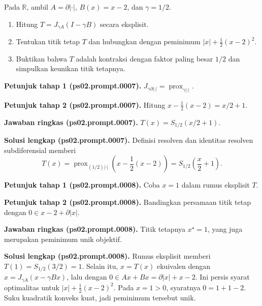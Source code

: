 \begin{exercise}
\label{orig03:ps02:problem:0004}
Pada $\mathbb{R}$, ambil $A=\partial|\cdot|$, $B(x)=x-2$, dan $\gamma=1/2$.
\begin{enumerate}
\item\label{orig03:ps02:prompt:0007}
Hitung $T=J_{\gamma A}(I-\gamma B)$ secara eksplisit.
\item\label{orig03:ps02:prompt:0008}
Tentukan titik tetap $T$ dan hubungkan dengan peminimum
$|x|+\tfrac12(x-2)^2$.
\item\label{orig03:ps02:prompt:0009}
Buktikan bahwa $T$ adalah kontraksi dengan faktor paling besar $1/2$ dan
simpulkan keunikan titik tetapnya.
\end{enumerate}
\end{exercise}

\par\noindent\textbf{Petunjuk tahap 1 (ps02.prompt.0007).}
$J_{\gamma\partial|\cdot|}=\operatorname{prox}_{\gamma|\cdot|}$.
\label{orig03:ps02:hint1:0007}
\par\noindent\textbf{Petunjuk tahap 2 (ps02.prompt.0007).}
Hitung $x-\tfrac12(x-2)=x/2+1$.
\label{orig03:ps02:hint2:0007}
\par\noindent\textbf{Jawaban ringkas (ps02.prompt.0007).}
$T(x)=S_{1/2}(x/2+1)$.
\label{orig03:ps02:answer:0007}
\par\noindent\textbf{Solusi lengkap (ps02.prompt.0007).}
Definisi resolven dan identitas resolven subdiferensial memberi
\[
 T(x)=\operatorname{prox}_{(1/2)|\cdot|}
 \left(x-\frac12(x-2)\right)
 =S_{1/2}\left(\frac x2+1\right).
\]
\label{orig03:ps02:solution:0007}

\par\noindent\textbf{Petunjuk tahap 1 (ps02.prompt.0008).}
Coba $x=1$ dalam rumus eksplisit $T$.
\label{orig03:ps02:hint1:0008}
\par\noindent\textbf{Petunjuk tahap 2 (ps02.prompt.0008).}
Bandingkan persamaan titik tetap dengan
$0\in x-2+\partial|x|$.
\label{orig03:ps02:hint2:0008}
\par\noindent\textbf{Jawaban ringkas (ps02.prompt.0008).}
Titik tetapnya $x^\star=1$, yang juga merupakan peminimum unik objektif.
\label{orig03:ps02:answer:0008}
\par\noindent\textbf{Solusi lengkap (ps02.prompt.0008).}
Rumus eksplisit memberi $T(1)=S_{1/2}(3/2)=1$. Selain itu,
$x=T(x)$ ekuivalen dengan
$x=J_{\gamma A}(x-\gamma Bx)$, lalu dengan
$0\in Ax+Bx=\partial|x|+x-2$. Ini persis syarat optimalitas untuk
$|x|+\tfrac12(x-2)^2$. Pada $x=1>0$, syaratnya $0=1+1-2$.
Suku kuadratik konveks kuat, jadi peminimum tersebut unik.
\label{orig03:ps02:solution:0008}

